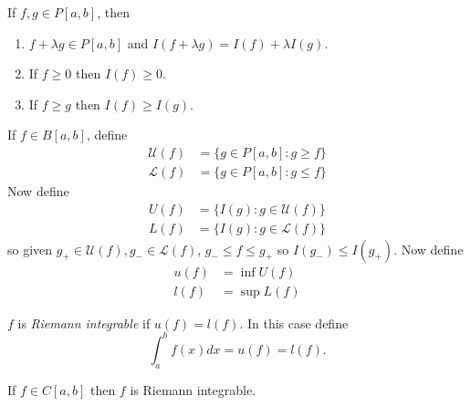 \documentclass[a4paper]{article}
\newcommand*{\riem}[1]{\mathcal{#1}}
\theoremstyle{definition}
\begin{document}
\begin{lemma}
  If \(f,g \in P[a, b]\), then
  \begin{enumerate}
  \item \(f + \lambda g \in P[a, b]\) and \(I(f + \lambda g) = I(f) + \lambda I(g)\).
  \item If \(f \geq 0\) then \(I(f) \geq 0\).
  \item If \(f \geq g\) then \(I(f) \geq I(g)\).
  \end{enumerate}
\end{lemma}


If \(f \in B[a, b]\), define
\begin{align*}
  \riem U(f) &= \{ g \in P[a, b]: g \geq f\} \\
  \riem L(f) &= \{ g \in P[a, b]: g \leq f\}
\end{align*}
Now define
\begin{align*}
  U(f) &= \{ I(g): g \in \riem U(f) \} \\
  L(f) &= \{ I(g): g \in \riem L(f) \}
\end{align*}
so given \(g_+ \in \riem U(f), g_- \in \riem L(f)\), \(g_- \leq f \leq g_+\) so \(I(g_-) \leq I(g_+)\). Now define
\begin{align*}
  u(f) &= \inf U(f) \\
  l(f) &= \sup L(f)
\end{align*}

\begin{definition}
  \(f\) is \emph{Riemann integrable} if \(u(f) = l(f)\). In this case define
  \[
    \int_{a}^{b} f(x) dx = u(f) = l(f).
  \]
\end{definition}

\begin{theorem}
  If \(f \in C[a, b]\) then \(f\) is Riemann integrable.
\end{theorem}
\end{document}
